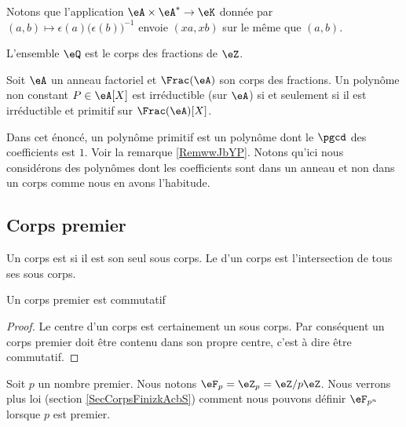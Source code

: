 Notons que l'application \( \eA\times \eA^*\to \eK\) donnée par \( (a,b)\mapsto \epsilon(a)\big( \epsilon(b) \big)^{-1}\) envoie \( (xa,xb)\) sur le même que \( (a,b)\).

L'ensemble \( \eQ\) est le corps des fractions de \( \eZ\).

\begin{theorem}     \label{ThofiIpXg} 
    Soit \( \eA\) un anneau factoriel et \( \Frac(\eA)\) son corps des fractions. Un polynôme non constant \( P\in \eA[X]\) est irréductible (sur \( \eA\)) si et seulement si il est irréductible et primitif sur \( \Frac(\eA)[X]\). 
\end{theorem}
Dans cet énoncé, un polynôme primitif est un polynôme dont le \( \pgcd\) des coefficients est \( 1\). Voir la remarque \ref{RemwwJbYP}. Notons qu'ici nous considérons des polynômes dont les coefficients sont dans un anneau et non dans un corps comme nous en avons l'habitude.

\subsection{Corps premier}
\label{subseccorpspremhBlYIv}

\begin{definition}
    Un corps est  si il est son seul sous corps. Le  d'un corps est l'intersection de tous ses sous corps.
\end{definition}

\begin{lemma}
    Un corps premier est commutatif
\end{lemma}

\begin{proof}
    Le centre d'un corps est certainement un sous corps. Par conséquent un corps premier doit être contenu dans son propre centre, c'est à dire être commutatif.
\end{proof}

Soit \( p\) un nombre premier. Nous notons \( \eF_p=\eZ_p=\eZ/p\eZ\). Nous verrons plus loi (section \ref{SecCorpsFinizkAcbS}) comment nous pouvons définir \( \eF_{p^n}\) lorsque \( p\) est premier.


